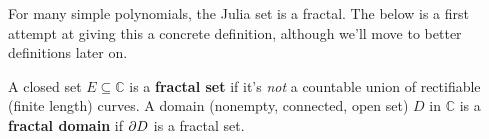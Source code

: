 \documentclass[twoside,10pt]{report}
\begin{document}
For many simple polynomials, the Julia set is a fractal. The below is a first attempt at giving this a concrete definition, although we'll move to better definitions later on.

\begin{defn}[]
A closed set $E \subseteq \mathbb{C}$ is a \textbf{fractal set} if it's \textit{not} a countable union of rectifiable (finite length) curves. A domain (nonempty, connected, open set) $D$ in $\mathbb{C}$ is a \textbf{fractal domain} if $\partial D$ is a fractal set.
\end{defn}
\end{document}
